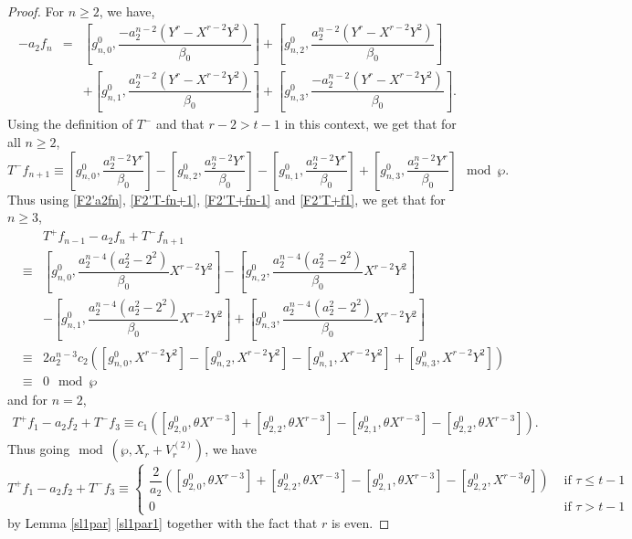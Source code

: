 \documentclass[10pt,a4paper]{amsart}
\begin{document}
\begin{proof}
For $n\geq 2$, we have,
\begin{eqnarray}\label{F2'a2fn}
-a_{2}f_{n}& = &\left[g_{n,0}^{0}, \dfrac{-a_{2}^{n-2}(Y^{r}-X^{r-2}Y^{2} )}{\beta_{0}}\right] +  \left[g_{n,2}^{0}, \dfrac{a_{2}^{n-2}(Y^{r}-X^{r-2}Y^{2})}{\beta_{0}}\right] \nonumber\\
&&+ \left[g_{n,1}^{0},\dfrac{a_{2}^{n-2}(Y^{r}-X^{r-2}Y^{2})}{\beta_{0}}\right] + \left[g_{n,3}^{0},\dfrac{-a_{2}^{n-2}(Y^{r}-X^{r-2}Y^{2})}{\beta_{0}}\right].
\end{eqnarray}%
Using the definition of $T^-$ and that $r-2>t-1$ in this context, we get that for all $n\geq2$,
\begin{equation}\label{F2'T-fn+1}
T^{-}f_{n+1} \equiv \left[g_{n,0}^{0}, \dfrac{a_{2}^{n-2}Y^{r}}{\beta_{0}}\right] -\left[g_{n,2}^{0}, \dfrac{a_{2}^{n-2}Y^{r}}{\beta_{0}}\right]-\left[g_{n,1}^{0}, \dfrac{a_{2}^{n-2}Y^{r}}{\beta_{0}}\right]+\left[g_{n,3}^{0}, \dfrac{a_{2}^{n-2}Y^{r}}{\beta_{0}}\right] \mod\wp.
\end{equation}
 Thus using \eqref{F2'a2fn}, \eqref{F2'T-fn+1}, \eqref{F2'T+fn-1} and \eqref{F2'T+f1}, we get that for $n\geq 3$, \begin{eqnarray}\label{sl1F2'radn}
& &T^{+}f_{n-1}-a_{2}f_{n}+T^{-}f_{n+1}  \nonumber \\
 &\equiv&
\left[g_{n,0}^{0},\dfrac {a_{2}^{n-4}(a_{2}^2-2^2)}{\beta_{0}}X^{r-2}Y^2 \right]
-\left[g_{n,2}^{0},\dfrac {a_{2}^{n-4}(a_{2}^2-2^2)}{\beta_{0}}X^{r-2}Y^2\right]  \nonumber\\
 & &  -\left[g_{n,1}^{0},\dfrac {a_{2}^{n-4}(a_{2}^2-2^2)}{\beta_{0}}X^{r-2}Y^2\right]+\left[g_{n,3}^{0},\dfrac {a_{2}^{n-4}(a_{2}^2-2^2)}{\beta_{0}}X^{r-2}Y^2\right]  \nonumber\\
 & \equiv& 2a_{2}^{n-3}c_{2}\left(\left[g_{n,0}^{0}, X^{r-2}Y^2 \right]-\left[g_{n,2}^{0}, X^{r-2}Y^2\right] -\left[g_{n,1}^{0}, X^{r-2}Y^2\right]+\left[g_{n,3}^{0}, X^{r-2}Y^2\right] \right)  \nonumber\\
& \equiv& 0 \mod \wp 
\end{eqnarray}
and for $n=2$,
\begin{eqnarray*}
 T^{+}f_{1}-a_{2}f_{2}+T^{-}f_{3}\equiv c_{1}\left(\left[g_{2,0}^0, \theta X^{r-3}\right] + \left[g_{2,2}^0, \theta X^{r-3}\right] -\left[g_{2,1}^0, \theta X^{r-3} \right]-\left[g_{2,2}^0, \theta X^{r-3} \right]\right).\enspace
\end{eqnarray*}
Thus going$\mod(\wp, X_{r}+V_{r}^{(2)})$, we have
\begin{equation}\label{sl1F2'rad2}   
    T^{+}f_{1}-a_{2}f_{2}+T^{-}f_{3}
\equiv\begin{cases} 
\dfrac{2}{a_{2}}\left([g_{2,0}^0, \theta X^{r-3}] + [g_{2,2}^0, \theta X^{r-3}]-[g_{2,1}^0, \theta X^{r-3}]-[g_{2,2}^0,X^{r-3}\theta]\right)&\text{ if } \tau\leq t-1\\
0 &\text{ if } \tau>t-1
\end{cases}
\end{equation}
by Lemma \ref{sl1par} \eqref{sl1par1} together with the fact that $r$ is even.


\end{proof}
\end{document}
